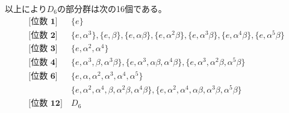 \documentclass[12pt,b5paper]{ltjsarticle}
\begin{document}
以上により$D_{6}$の部分群は次の16個である。
\begin{align}
 \textbf{[位数 1]} &\
 \{ e \}
 \\
 \textbf{[位数 2]} &\
 \{ e, \alpha^3 \}, \{ e, \beta \}, \{ e, \alpha\beta \},
 \{ e, \alpha^2\beta \}, \{ e, \alpha^3\beta \},
 \{ e, \alpha^4\beta\}, \{ e, \alpha^5\beta \}
 \\
 \textbf{[位数 3]} &\
  \{ e, \alpha^2, \alpha^4 \}
 \\
 \textbf{[位数 4]} &\
 \{e, \alpha^3, \beta, \alpha^3\beta \},
 \{e, \alpha^3, \alpha\beta, \alpha^4\beta \},
 \{e, \alpha^3, \alpha^2\beta, \alpha^5\beta \}
 \\
 \textbf{[位数 6]} &\
 \{ e, \alpha, \alpha^2, \alpha^3, \alpha^4, \alpha^5 \}\\
&\ \{e, \alpha^2, \alpha^4, \beta, \alpha^2\beta, \alpha^4\beta \},
 \{e, \alpha^2, \alpha^4, \alpha\beta, \alpha^3\beta, \alpha^5\beta \}
 \\
 \textbf{[位数 12]} &\
 D_{6}
\end{align}

\hrulefill
\end{document}
